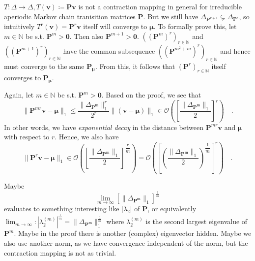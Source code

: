 \documentclass[../../main.tex]{subfiles}
\begin{document}
\begin{remark}
    $T: \Delta \to \Delta, T(\bm{v}) \coloneqq \bm{Pv}$ is not a contraction mapping in general for irreducible aperiodic Markov chain tranisition matrices $\bm{P}$. But we still have $\Delta_{\bm{P}^{r+1}} \subsetneq \Delta_{\bm{P}^{r}}$, so intuitively $T^{r}(\bm{v}) = \bm{P}^r\bm{v}$ itself will converge to $\bm{\mu}$. To formally prove this, let $m \in \mathbb{N}$ be s.t. $\bm{P}^m > \bm{0}$. Then also $\bm{P}^{m + 1} > \bm{0}$. $((\bm{P}^m)^r)_{r \in \mathbb{N}}$ and $((\bm{P}^{m + 1})^r)_{r \in \mathbb{N}}$ have the common subsequence $((\bm{P}^{m^2 + m})^r)_{r \in \mathbb{N}}$ and hence must converge to the same $\bm{P_\mu}$. From this, it follows that $(\bm{P}^r)_{r \in \mathbb{N}}$ itself converges to $\bm{P_\mu}$.
\end{remark}

\begin{remark}
    \label{remark:exponential_decay}
    Again, let $m \in \mathbb{N}$ be s.t. $\bm{P}^m > \bm{0}$. Based on the proof, we see that
    \[
        \| \bm{P}^{mr} \bm{v} - \bm{\mu} \|_1 \leq \dfrac{\|\Delta_{\bm{P^m}}\|_1^r}{2^r} \| (\bm{v} - \bm{\mu}) \|_1 \in \mathcal{O} \left( \left[ \frac{\|\Delta_{\bm{P^m}}\|_1}{2} \right] ^r \right) \quad .
    \]
    In other words, we have \emph{exponential decay} in the distance between $\bm{P}^{mr} \bm{v}$ and $\bm{\mu}$ with respect to $r$. Hence, we also have
    \[
        \| \bm{P}^{r} \bm{v} - \bm{\mu} \|_1 \in \mathcal{O} \left( \left[ \frac{\|\Delta_{\bm{P^m}}\|_1}{2} \right] ^{\dfrac{r}{m}} \right) = 
        \mathcal{O} \left( \left[ \left( \frac{\|\Delta_{\bm{P^m}}\|_1}{2} \right) ^{\dfrac{1}{m}} \right] ^r \right) \quad .
    \]
\end{remark}

\begin{hypothesis}
    Maybe
    \[
        \lim_{m \to \infty} \left[ \|\Delta_{\bm{P^m}}\|_1 \right] ^{\frac{1}{m}}
    \]
    evaluates to something interesting like $|\lambda_2|$ of $\bm{P}$, or equivalently $\lim_{m \to \infty}: |\lambda_2^{(m)}|^{\frac{1}{m}} = \|\Delta_{\bm{P^m}}\|_1^\frac{1}{m}$ where $\lambda_2^{(m)}$ is the second largest eigenvalue of $\bm{P}^m$. Maybe in the proof there is another (complex) eigenvector hidden. Maybe we also use another norm, as we have convergence independent of the norm, but the contraction mapping is not as trivial.
\end{hypothesis}
\end{document}

